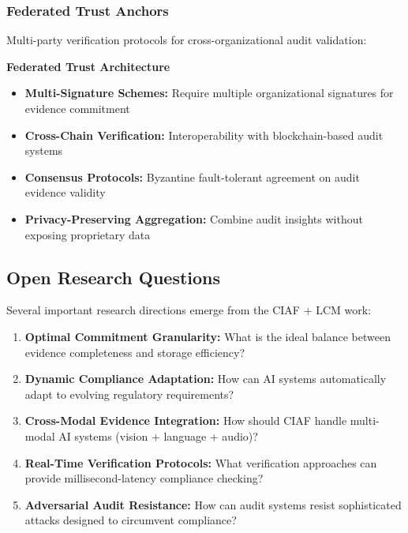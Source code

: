 \documentclass[12pt,a4paper]{article}
\begin{document}
\subsubsection{Federated Trust Anchors}

Multi-party verification protocols for cross-organizational audit validation:

\begin{technicalbox}
\textbf{Federated Trust Architecture}
\begin{itemize}
\item \textbf{Multi-Signature Schemes:} Require multiple organizational signatures for evidence commitment
\item \textbf{Cross-Chain Verification:} Interoperability with blockchain-based audit systems
\item \textbf{Consensus Protocols:} Byzantine fault-tolerant agreement on audit evidence validity
\item \textbf{Privacy-Preserving Aggregation:} Combine audit insights without exposing proprietary data
\end{itemize}
\end{technicalbox}

\subsection{Open Research Questions}

Several important research directions emerge from the CIAF + LCM work:

\begin{enumerate}
\item \textbf{Optimal Commitment Granularity:} What is the ideal balance between evidence completeness and storage efficiency?

\item \textbf{Dynamic Compliance Adaptation:} How can AI systems automatically adapt to evolving regulatory requirements?

\item \textbf{Cross-Modal Evidence Integration:} How should CIAF handle multi-modal AI systems (vision + language + audio)?

\item \textbf{Real-Time Verification Protocols:} What verification approaches can provide millisecond-latency compliance checking?

\item \textbf{Adversarial Audit Resistance:} How can audit systems resist sophisticated attacks designed to circumvent compliance?
\end{enumerate}
\end{document}
